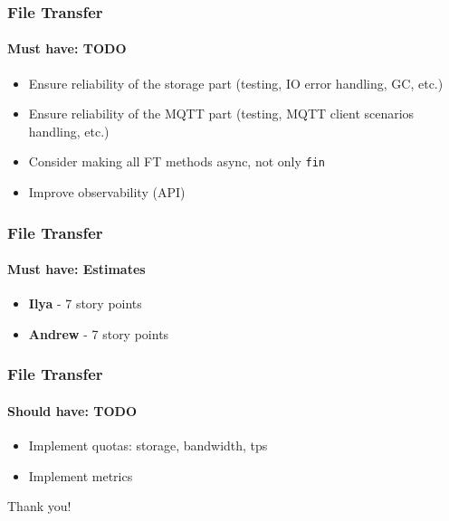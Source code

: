 \documentclass{beamer}
\begin{document}
\begin{frame}
    \frametitle{File Transfer}
    \framesubtitle{Must have: TODO}
    \begin{itemize}
        \item Ensure reliability of the storage part (testing, IO error handling, GC, etc.)
        \item Ensure reliability of the MQTT part (testing, MQTT client scenarios handling, etc.)
        \item Consider making all FT methods async, not only \lstinline{fin}
        \item Improve observability (API)
    \end{itemize}
\end{frame}

\begin{frame}
    \frametitle{File Transfer}
    \framesubtitle{Must have: Estimates}
    \begin{itemize}
        \item \textbf{Ilya} - 7 story points
        \item \textbf{Andrew} - 7 story points
    \end{itemize}
\end{frame}

\begin{frame}
    \frametitle{File Transfer}
    \framesubtitle{Should have: TODO}
    \begin{itemize}
        \item Implement quotas: storage, bandwidth, tps
        \item Implement metrics
    \end{itemize}
\end{frame}

\begin{frame}
    \begin{center}
        Thank you!
    \end{center}
\end{frame}
\end{document}

